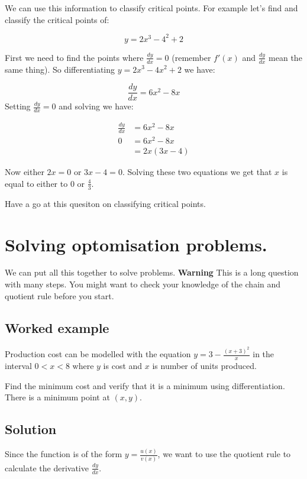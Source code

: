 \documentclass[
  a4paper,
]{scrbook}
\begin{document}
We can use this information to classify critical points. For example
let's find and classify the critical points of:

\[
y=2x^3 - 4^2 + 2
\]

First we need to find the points where \(\frac{dy}{dx} = 0\) (remember
\(f'(x)\) and \(\frac{dy}{dx}\) mean the same thing). So differentiating
\(y=2x^3 - 4x^2 + 2\) we have:

\[
\frac{dy}{dx} = 6x^2 -8x
\] Setting \(\frac{dy}{dx} = 0\) and solving we have:

\[
\begin{aligned} \frac{dy}{dx} &= 6x^2 -8x \\
0 &= 6x^2 -8x \\
&= 2x(3x-4)
\end{aligned}
\]

Now either \(2x=0\) or \(3x-4 =0\). Solving these two equations we get
that \(x\) is equal to either to \(0\) or \(\frac{4}{3}\).

Have a go at this quesiton on classifying critical points.

\section{Solving optomisation
problems.}\label{solving-optomisation-problems.}

We can put all this together to solve problems. \textbf{Warning} This is
a long question with many steps. You might want to check your knowledge
of the chain and quotient rule before you start.

\subsection{Worked example}\label{worked-example}

Production cost can be modelled with the equation
\(y = 3 - \frac{(x + 3)^{2}}{x}\) in the interval \(0 < x < 8\) where
\(y\) is cost and \(x\) is number of units produced.

Find the minimum cost and verify that it is a minimum using
differentiation. There is a minimum point at \((x, y)\).

\subsection{Solution}\label{solution}

Since the function is of the form \(y = \frac{u(x)}{v(x)}\), we want to
use the quotient rule to calculate the derivative \(\frac{dy}{dx}\).
\end{document}
